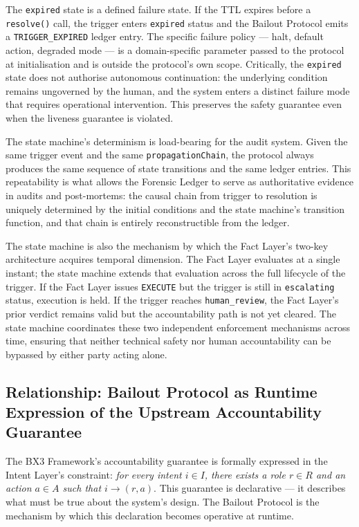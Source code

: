 The \texttt{expired} state is a defined failure state.  If the TTL expires before
a \texttt{resolve()} call, the trigger enters \texttt{expired} status and the
Bailout Protocol emits a \texttt{TRIGGER\_EXPIRED} ledger entry.  The specific
failure policy --- halt, default action, degraded mode --- is a domain-specific
parameter passed to the protocol at initialisation and is outside the protocol's
own scope.  Critically, the \texttt{expired} state does not authorise autonomous
continuation: the underlying condition remains ungoverned by the human, and the
system enters a distinct failure mode that requires operational intervention.
This preserves the safety guarantee even when the liveness guarantee is violated.

The state machine's determinism is load-bearing for the audit system.  Given the
same trigger event and the same \texttt{propagationChain}, the protocol always
produces the same sequence of state transitions and the same ledger entries.
This repeatability is what allows the Forensic Ledger to serve as authoritative
evidence in audits and post-mortems: the causal chain from trigger to resolution
is uniquely determined by the initial conditions and the state machine's
transition function, and that chain is entirely reconstructible from the ledger.

The state machine is also the mechanism by which the Fact Layer's two-key
architecture acquires temporal dimension.  The Fact Layer evaluates at a single
instant; the state machine extends that evaluation across the full lifecycle of
the trigger.  If the Fact Layer issues \texttt{EXECUTE} but the trigger is still
in \texttt{escalating} status, execution is held.  If the trigger reaches
\texttt{human\_review}, the Fact Layer's prior verdict remains valid but the
accountability path is not yet cleared.  The state machine coordinates these
two independent enforcement mechanisms across time, ensuring that neither
technical safety nor human accountability can be bypassed by either party acting
alone.

\subsection{Relationship: Bailout Protocol as Runtime Expression of
            the Upstream Accountability Guarantee}

The BX3 Framework's accountability guarantee is formally expressed in the
Intent Layer's constraint: \emph{for every intent $i \in I$, there exists a
role $r \in R$ and an action $a \in A$ such that $i \rightarrow (r, a)$}.
This guarantee is declarative --- it describes what must be true about the
system's design.  The Bailout Protocol is the mechanism by which this
declaration becomes operative at runtime.

